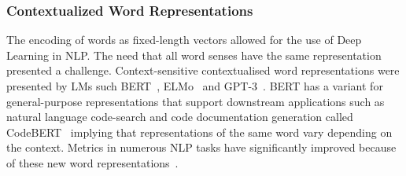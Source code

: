 \subsubsection{Contextualized Word Representations}
The encoding of words as fixed-length vectors allowed for the use of Deep Learning in NLP. The need that all word senses have the same representation presented a challenge. Context-sensitive contextualised word representations were presented by LMs such BERT~\cite{bert}, ELMo~\cite{elmo} and GPT-3~\cite{Gpt3}. 
BERT has a variant for general-purpose representations that support downstream applications such as natural language code-search and code documentation generation called CodeBERT~\cite{codebert} implying that representations of the same word vary depending on the context. 
Metrics in numerous NLP tasks have significantly improved because of these new word representations~\cite{contextual}. 